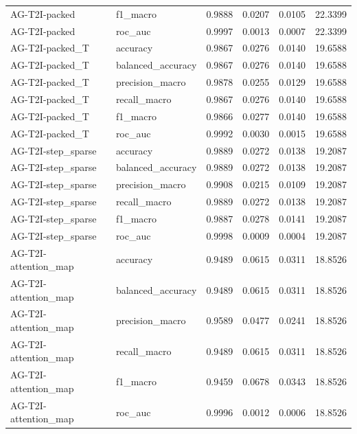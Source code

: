 \begin{tabular}{llrrrr}
AG-T2I-packed & f1_macro & 0.9888 & 0.0207 & 0.0105 & 22.3399 \\
AG-T2I-packed & roc_auc & 0.9997 & 0.0013 & 0.0007 & 22.3399 \\
AG-T2I-packed_T & accuracy & 0.9867 & 0.0276 & 0.0140 & 19.6588 \\
AG-T2I-packed_T & balanced_accuracy & 0.9867 & 0.0276 & 0.0140 & 19.6588 \\
AG-T2I-packed_T & precision_macro & 0.9878 & 0.0255 & 0.0129 & 19.6588 \\
AG-T2I-packed_T & recall_macro & 0.9867 & 0.0276 & 0.0140 & 19.6588 \\
AG-T2I-packed_T & f1_macro & 0.9866 & 0.0277 & 0.0140 & 19.6588 \\
AG-T2I-packed_T & roc_auc & 0.9992 & 0.0030 & 0.0015 & 19.6588 \\
AG-T2I-step_sparse & accuracy & 0.9889 & 0.0272 & 0.0138 & 19.2087 \\
AG-T2I-step_sparse & balanced_accuracy & 0.9889 & 0.0272 & 0.0138 & 19.2087 \\
AG-T2I-step_sparse & precision_macro & 0.9908 & 0.0215 & 0.0109 & 19.2087 \\
AG-T2I-step_sparse & recall_macro & 0.9889 & 0.0272 & 0.0138 & 19.2087 \\
AG-T2I-step_sparse & f1_macro & 0.9887 & 0.0278 & 0.0141 & 19.2087 \\
AG-T2I-step_sparse & roc_auc & 0.9998 & 0.0009 & 0.0004 & 19.2087 \\
AG-T2I-attention_map & accuracy & 0.9489 & 0.0615 & 0.0311 & 18.8526 \\
AG-T2I-attention_map & balanced_accuracy & 0.9489 & 0.0615 & 0.0311 & 18.8526 \\
AG-T2I-attention_map & precision_macro & 0.9589 & 0.0477 & 0.0241 & 18.8526 \\
AG-T2I-attention_map & recall_macro & 0.9489 & 0.0615 & 0.0311 & 18.8526 \\
AG-T2I-attention_map & f1_macro & 0.9459 & 0.0678 & 0.0343 & 18.8526 \\
AG-T2I-attention_map & roc_auc & 0.9996 & 0.0012 & 0.0006 & 18.8526 \\
\bottomrule
\end{tabular}
